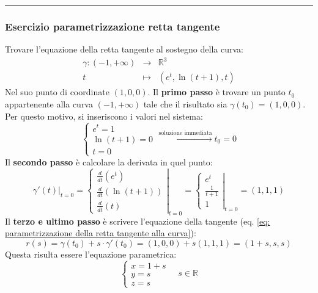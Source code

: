 \documentclass[a4paper]{article}
\newcommand{\longline}{\noindent\rule{\textwidth}{0.4pt}}
\begin{document}
	\longline

	\subsubsection{Esercizio parametrizzazione retta tangente}\label{subsubsection: esercizio parametrizzazione retta tangente}
	
	Trovare l'equazione della retta tangente al sostegno della curva:
	\begin{equation*}
		\begin{array}{rcl}
			\gamma:\left(-1, +\infty\right) &\rightarrow& \mathbb{R}^{3} \\
			t &\mapsto& \left(e^{t}, \ln\left(t+1\right), t\right)
		\end{array}
	\end{equation*}
	Nel suo punto di coordinate $\left(1, 0, 0\right)$. Il \textbf{primo passo} è trovare un punto $t_{0}$ appartenente alla curva $\left(-1,+\infty\right)$ tale che il risultato sia $\gamma\left(t_{0}\right) = \left(1,0,0\right)$. Per questo motivo, si inseriscono i valori nel sistema:
	\begin{equation*}
		\begin{cases}
			e^{t} = 1 \\
			\ln\left(t+1\right) = 0 \\
			t = 0
		\end{cases}
		\xrightarrow{\text{soluzione immediata}}
		t_{0} = 0
	\end{equation*}
	Il \textbf{secondo passo} è calcolare la derivata in quel punto:
	\begin{equation*}
		\left. \gamma'\left(t\right) \right|_{t = 0} 
		=
		\left. 
		\begin{cases}
			\frac{d}{dt} \left(e^{t}\right) \\
			\frac{d}{dt} \left(\ln\left(t+1\right)\right) \\
			\frac{d}{dt} \left(t\right)
		\end{cases} 
		\right|_{t=0}
		=
		\left.
		\begin{cases}
			e^{t} \\
			\frac{1}{t+1} \\
			1
		\end{cases}
		\right|_{t=0}
		=
		\left(1,1,1\right)
	\end{equation*}
	Il \textbf{terzo e ultimo passo} è scrivere l'equazione della tangente (eq. \ref{eq: parametrizzazione della retta tangente alla curva}):
	\begin{equation*}
		r\left(s\right) = \gamma\left(t_{0}\right) + s \cdot \gamma'\left(t_{0}\right) = \left(1,0,0\right) + s\left(1,1,1\right) = \left(1+s, s, s\right)
	\end{equation*}
	Questa risulta essere l'equazione parametrica:
	\begin{equation*}
		\begin{cases}
			x = 1+s \\
			y = s \\
			z = s
		\end{cases}
		\hspace{1em}
		s \in \mathbb{R}
	\end{equation*}\newpage
\end{document}
